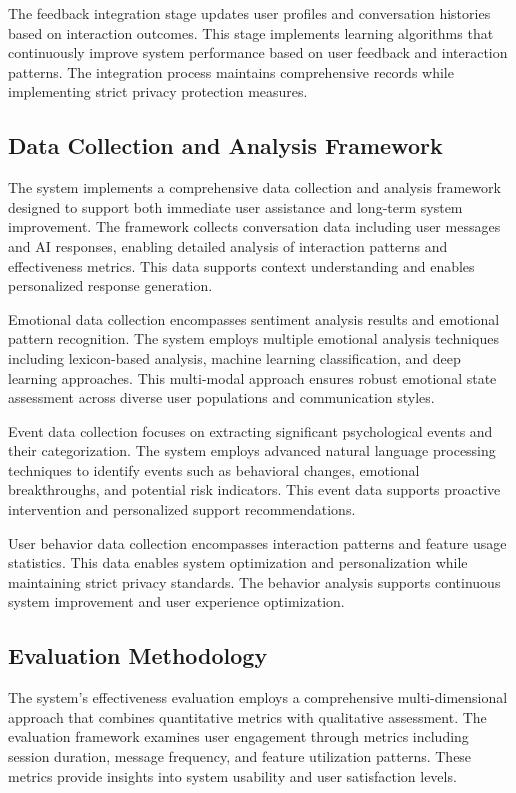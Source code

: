 The feedback integration stage updates user profiles and conversation histories based on interaction outcomes. This stage implements learning algorithms that continuously improve system performance based on user feedback and interaction patterns. The integration process maintains comprehensive records while implementing strict privacy protection measures.

\subsection{Data Collection and Analysis Framework}

The system implements a comprehensive data collection and analysis framework designed to support both immediate user assistance and long-term system improvement. The framework collects conversation data including user messages and AI responses, enabling detailed analysis of interaction patterns and effectiveness metrics. This data supports context understanding and enables personalized response generation.

Emotional data collection encompasses sentiment analysis results and emotional pattern recognition. The system employs multiple emotional analysis techniques including lexicon-based analysis, machine learning classification, and deep learning approaches. This multi-modal approach ensures robust emotional state assessment across diverse user populations and communication styles.

Event data collection focuses on extracting significant psychological events and their categorization. The system employs advanced natural language processing techniques to identify events such as behavioral changes, emotional breakthroughs, and potential risk indicators. This event data supports proactive intervention and personalized support recommendations.

User behavior data collection encompasses interaction patterns and feature usage statistics. This data enables system optimization and personalization while maintaining strict privacy standards. The behavior analysis supports continuous system improvement and user experience optimization.

\subsection{Evaluation Methodology}

The system's effectiveness evaluation employs a comprehensive multi-dimensional approach that combines quantitative metrics with qualitative assessment. The evaluation framework examines user engagement through metrics including session duration, message frequency, and feature utilization patterns. These metrics provide insights into system usability and user satisfaction levels.

